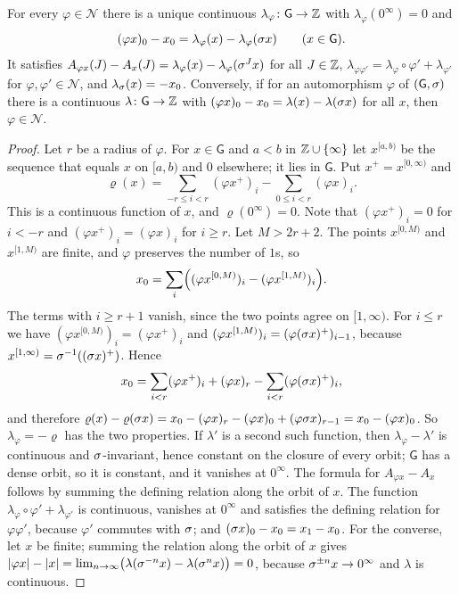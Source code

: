 \begin{lemma}[flux]\label{cl:lem:95flux}
For every $\varphi\in\mathcal N$ there is a unique continuous $\lambda_\varphi\colon \mathsf G\to\mathbb{Z}$ with $\lambda_\varphi(0^\infty)=0$ and
\[
(\varphi x)_0-x_0=\lambda_\varphi(x)-\lambda_\varphi(\sigma x)\qquad(x\in \mathsf G).
\]
It satisfies $A_{\varphi x}(J)-A_x(J)=\lambda_\varphi(x)-\lambda_\varphi(\sigma^Jx)$ for all $J\in\mathbb{Z}$, $\lambda_{\varphi\varphi'}=\lambda_\varphi\circ\varphi'+\lambda_{\varphi'}$ for $\varphi,\varphi'\in\mathcal N$, and $\lambda_{\sigma}(x)=-x_0$. Conversely, if for an automorphism $\varphi$ of $(\mathsf G,\sigma)$ there is a continuous $\lambda\colon\mathsf G\to\mathbb{Z}$ with $(\varphi x)_0-x_0=\lambda(x)-\lambda(\sigma x)$ for all $x$, then $\varphi\in\mathcal N$.
\end{lemma}

\begin{proof}
Let $r$ be a radius of $\varphi$. For $x\in \mathsf G$ and $a<b$ in $\mathbb{Z}\cup\{\infty\}$ let $x^{[a,b)}$ be the sequence that equals $x$ on $[a,b)$ and $0$ elsewhere; it lies in $\mathsf G$. Put $x^+=x^{[0,\infty)}$ and
\[
\varrho(x)=\sum_{-r\le i<r}(\varphi x^+)_i-\sum_{0\le i<r}(\varphi x)_i .
\]
This is a continuous function of $x$, and $\varrho(0^\infty)=0$. Note that $(\varphi x^+)_i=0$ for $i<-r$ and $(\varphi x^+)_i=(\varphi x)_i$ for $i\ge r$. Let $M>2r+2$. The points $x^{[0,M)}$ and $x^{[1,M)}$ are finite, and $\varphi$ preserves the number of $1$s, so
\[
x_0=\sum_i\Bigl((\varphi x^{[0,M)})_i-(\varphi x^{[1,M)})_i\Bigr).
\]
The terms with $i\ge r+1$ vanish, since the two points agree on $[1,\infty)$. For $i\le r$ we have $(\varphi x^{[0,M)})_i=(\varphi x^+)_i$ and $(\varphi x^{[1,M)})_i=(\varphi(\sigma x)^+)_{i-1}$, because $x^{[1,\infty)}=\sigma^{-1}((\sigma x)^+)$. Hence
\[
x_0=\sum_{i<r}(\varphi x^+)_i+(\varphi x)_r-\sum_{i<r}(\varphi(\sigma x)^+)_i ,
\]
and therefore $\varrho(x)-\varrho(\sigma x)=x_0-(\varphi x)_r-(\varphi x)_0+(\varphi\sigma x)_{r-1}=x_0-(\varphi x)_0$. So $\lambda_\varphi=-\varrho$ has the two properties. If $\lambda'$ is a second such function, then $\lambda_\varphi-\lambda'$ is continuous and $\sigma$-invariant, hence constant on the closure of every orbit; $\mathsf G$ has a dense orbit, so it is constant, and it vanishes at $0^\infty$. The formula for $A_{\varphi x}-A_x$ follows by summing the defining relation along the orbit of $x$. The function $\lambda_\varphi\circ\varphi'+\lambda_{\varphi'}$ is continuous, vanishes at $0^\infty$ and satisfies the defining relation for $\varphi\varphi'$, because $\varphi'$ commutes with $\sigma$; and $(\sigma x)_0-x_0=x_1-x_0$. For the converse, let $x$ be finite; summing the relation along the orbit of $x$ gives $|\varphi x|-|x|=\lim_{n\to\infty}\bigl(\lambda(\sigma^{-n}x)-\lambda(\sigma^{n}x)\bigr)=0$, because $\sigma^{\pm n}x\to0^\infty$ and $\lambda$ is continuous.
\end{proof}

